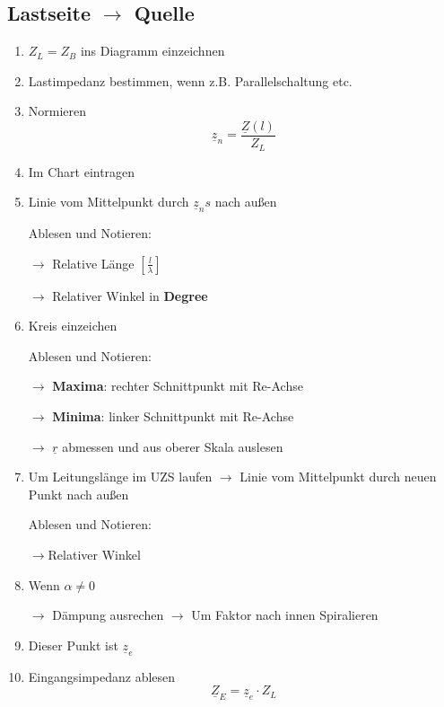 \subsection[Von Last zu Quelle]{Lastseite $\rightarrow$ Quelle}
\begin{enumerate}
    \item $Z_L = Z_B$ ins Diagramm einzeichnen
    \item Lastimpedanz bestimmen,
          wenn z.B. Parallelschaltung etc.
    \item Normieren
          \[\underline{z}_n = \frac{\underline{Z}(l)}{Z_L} \]
    \item Im Chart eintragen
    \item Linie vom Mittelpunkt durch $\underline{z}_ns$ nach außen

          Ablesen und Notieren:

          $\rightarrow$ Relative Länge $\left[\frac{l}{\lambda}\right]$

          $\rightarrow$ Relativer Winkel in \textbf{Degree}
    \item Kreis einzeichen

          Ablesen und Notieren:

          $\rightarrow$ \textbf{Maxima}: rechter Schnittpunkt mit Re-Achse

          $\rightarrow$ \textbf{Minima}: linker Schnittpunkt mit Re-Achse

          $\rightarrow$ $ \underline{r} $ abmessen und aus oberer Skala auslesen
    \item Um Leitungslänge im UZS laufen
          $\rightarrow$ Linie vom Mittelpunkt durch neuen Punkt nach außen

          Ablesen und Notieren:

          $\rightarrow$Relativer Winkel
    \item Wenn $\alpha\neq 0$

          $\rightarrow$ Dämpung ausrechen
          $\rightarrow$ Um Faktor nach innen Spiralieren

    \item Dieser Punkt ist $\underline{z}_e$
    \item Eingangsimpedanz ablesen
          \[\underline{Z}_E = \underline{z}_e \cdot Z_L\]
\end{enumerate}


